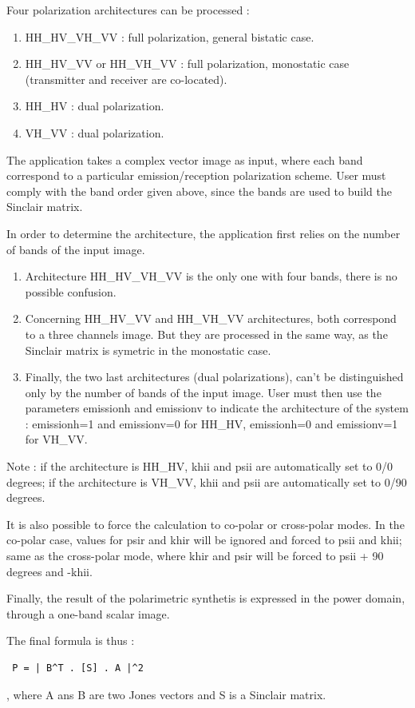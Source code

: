 Four polarization architectures can be processed :
\begin{enumerate}
\item HH\_HV\_VH\_VV : full polarization, general bistatic case.
\item HH\_HV\_VV or HH\_VH\_VV : full polarization, monostatic case (transmitter and receiver are co-located).
\item HH\_HV : dual polarization.
\item VH\_VV : dual polarization.
\end{enumerate}
The application takes a complex vector image as input, where each band correspond to a particular emission/reception polarization scheme.
User must comply with the band order given above, since the bands are used to build the Sinclair matrix.

In order to determine the architecture, the application first relies on the number of bands of the input image.
\begin{enumerate}
\item Architecture HH\_HV\_VH\_VV is the only one with four bands, there is no possible confusion.
\item Concerning HH\_HV\_VV and HH\_VH\_VV architectures, both correspond to a three channels image. But they are processed in the same way, as the Sinclair matrix is symetric in the monostatic case.
\item Finally, the two last architectures (dual polarizations), can't be distinguished only by the number of bands of the input image. User must then use the parameters emissionh and emissionv to indicate the architecture of the system : emissionh=1 and emissionv=0 for HH\_HV,  emissionh=0 and emissionv=1 for VH\_VV.
\end{enumerate}
Note : if the architecture is HH\_HV, khii and psii are automatically set to 0/0 degrees; if the architecture is VH\_VV, khii and psii are automatically set to 0/90 degrees.

It is also possible to force the calculation to co-polar or cross-polar modes.
In the co-polar case, values for psir and khir will be ignored and forced to psii and khii; same as the cross-polar mode, where khir and psir will be forced to psii + 90 degrees and -khii.

Finally, the result of the polarimetric synthetis is expressed in the power domain, through a one-band scalar image. \newline


 
The final formula is thus : \begin{verbatim} P = | B^T . [S] . A |^2 \end{verbatim} , where A ans B are two Jones vectors and S is a Sinclair matrix.
 
